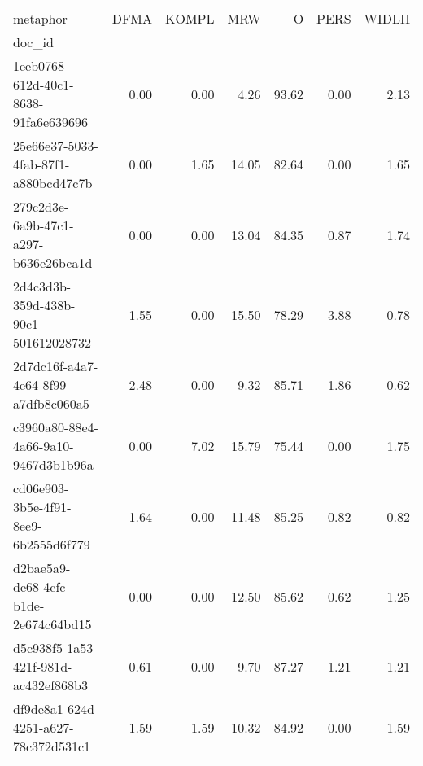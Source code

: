 \begin{tabular}{lrrrrrr}
\toprule
metaphor & DFMA & KOMPL & MRW & O & PERS & WIDLII \\
doc_id &  &  &  &  &  &  \\
\midrule
1eeb0768-612d-40c1-8638-91fa6e639696 & 0.00 & 0.00 & 4.26 & 93.62 & 0.00 & 2.13 \\
25e66e37-5033-4fab-87f1-a880bcd47c7b & 0.00 & 1.65 & 14.05 & 82.64 & 0.00 & 1.65 \\
279c2d3e-6a9b-47c1-a297-b636e26bca1d & 0.00 & 0.00 & 13.04 & 84.35 & 0.87 & 1.74 \\
2d4c3d3b-359d-438b-90c1-501612028732 & 1.55 & 0.00 & 15.50 & 78.29 & 3.88 & 0.78 \\
2d7dc16f-a4a7-4e64-8f99-a7dfb8c060a5 & 2.48 & 0.00 & 9.32 & 85.71 & 1.86 & 0.62 \\
c3960a80-88e4-4a66-9a10-9467d3b1b96a & 0.00 & 7.02 & 15.79 & 75.44 & 0.00 & 1.75 \\
cd06e903-3b5e-4f91-8ee9-6b2555d6f779 & 1.64 & 0.00 & 11.48 & 85.25 & 0.82 & 0.82 \\
d2bae5a9-de68-4cfc-b1de-2e674c64bd15 & 0.00 & 0.00 & 12.50 & 85.62 & 0.62 & 1.25 \\
d5c938f5-1a53-421f-981d-ac432ef868b3 & 0.61 & 0.00 & 9.70 & 87.27 & 1.21 & 1.21 \\
df9de8a1-624d-4251-a627-78c372d531c1 & 1.59 & 1.59 & 10.32 & 84.92 & 0.00 & 1.59 \\
\bottomrule
\end{tabular}
